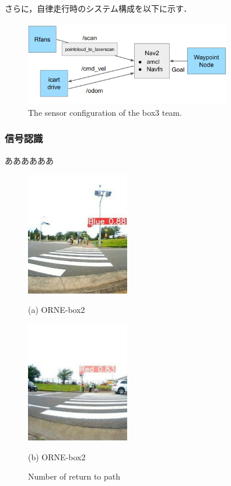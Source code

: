 \documentclass[twocolumn, 9pt]{jsproceedings}
\begin{document}
さらに，自律走行時のシステム構成を以下に示す．

\begin{figure}[h!]
  \centering
  \includegraphics[width=90mm]{fig/box3_system.pdf}
  \caption{The sensor configuration of the box3 team.}
  \label{fig:box3-system}
\end{figure}


\subsubsection{信号認識}
ああああああ

\begin{figure}[h!]
  \begin{minipage}[t]{0.47\linewidth}
    \centering
    \includegraphics[width=45mm]{fig/blue_cut.pdf}
    \caption*{(a) ORNE-box2}
  \end{minipage}
  \hspace*{2mm}
  \begin{minipage}[t]{0.47\linewidth}
    \centering
    \includegraphics[width=45mm]{fig/red_cut.pdf}
    \caption*{(b) ORNE-box2}
  \end{minipage}%
  \caption{Number of return to path}
\end{figure}
\end{document}
